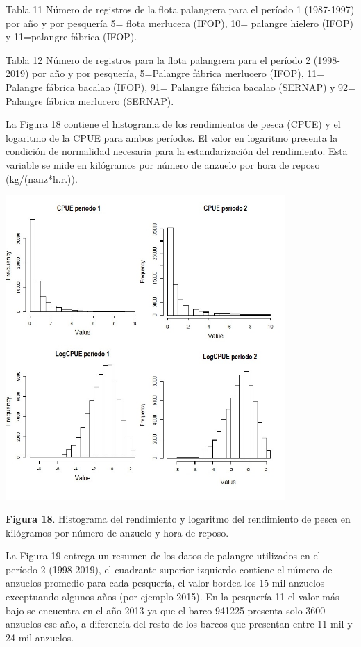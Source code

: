 \documentclass[
  spanish,
]{article}
\begin{document}
Tabla 11 Número de registros de la flota palangrera para el período 1
(1987-1997) por año y por pesquería 5= flota merlucera (IFOP), 10=
palangre hielero (IFOP) y 11=palangre fábrica (IFOP).

Tabla 12 Número de registros para la flota palangrera para el período 2
(1998-2019) por año y por pesquería, 5=Palangre fábrica merlucero
(IFOP), 11= Palangre fábrica bacalao (IFOP), 91= Palangre fábrica
bacalao (SERNAP) y 92= Palangre fábrica merlucero (SERNAP).

La Figura 18 contiene el histograma de los rendimientos de pesca (CPUE)
y el logaritmo de la CPUE para ambos períodos. El valor en logaritmo
presenta la condición de normalidad necesaria para la estandarización
del rendimiento. Esta variable se mide en kilógramos por número de
anzuelo por hora de reposo (kg/(nanz*h.r.)).

\begin{center}
\includegraphics[width=0.8\textwidth]{Figuras/Figura_18.png}
\end{center}

\small \textbf{Figura 18}. Histograma del rendimiento y logaritmo del
rendimiento de pesca en kilógramos por número de anzuelo y hora de
reposo. \vspace{0.5cm} \normalsize 

La Figura 19 entrega un resumen de los datos de palangre utilizados en
el período 2 (1998-2019), el cuadrante superior izquierdo contiene el
número de anzuelos promedio para cada pesquería, el valor bordea los 15
mil anzuelos exceptuando algunos años (por ejemplo 2015). En la
pesquería 11 el valor más bajo se encuentra en el año 2013 ya que el
barco 941225 presenta solo 3600 anzuelos ese año, a diferencia del resto
de los barcos que presentan entre 11 mil y 24 mil anzuelos.
\end{document}
